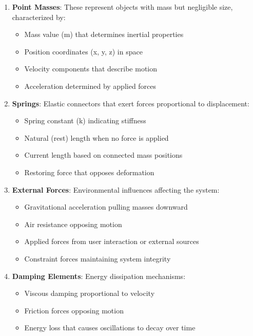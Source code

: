 \begin{enumerate}
    \item \textbf{Point Masses}: These represent objects with mass but negligible size, characterized by:
    \begin{itemize}
        \item Mass value (m) that determines inertial properties
        \item Position coordinates (x, y, z) in space
        \item Velocity components that describe motion
        \item Acceleration determined by applied forces
    \end{itemize}
    
    \item \textbf{Springs}: Elastic connectors that exert forces proportional to displacement:
    \begin{itemize}
        \item Spring constant (k) indicating stiffness
        \item Natural (rest) length when no force is applied
        \item Current length based on connected mass positions
        \item Restoring force that opposes deformation
    \end{itemize}
    
    \item \textbf{External Forces}: Environmental influences affecting the system:
    \begin{itemize}
        \item Gravitational acceleration pulling masses downward
        \item Air resistance opposing motion
        \item Applied forces from user interaction or external sources
        \item Constraint forces maintaining system integrity
    \end{itemize}
    
    \item \textbf{Damping Elements}: Energy dissipation mechanisms:
    \begin{itemize}
        \item Viscous damping proportional to velocity
        \item Friction forces opposing motion
        \item Energy loss that causes oscillations to decay over time
    \end{itemize}
\end{enumerate}

